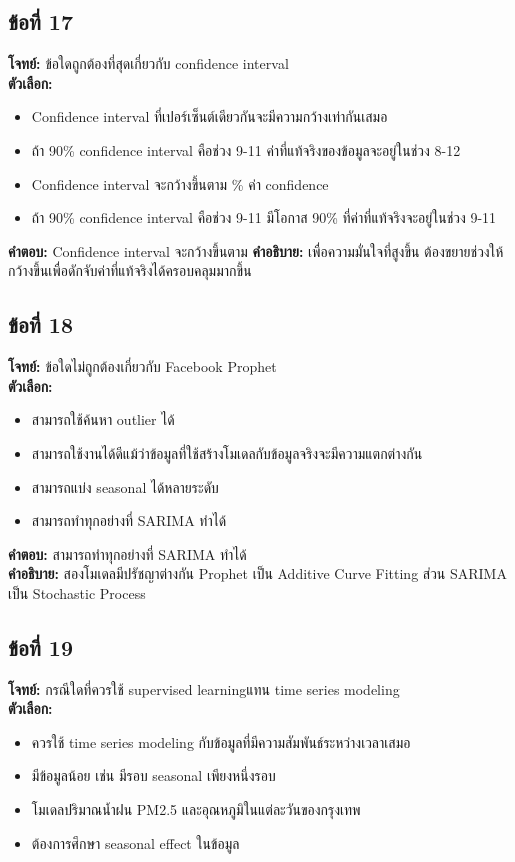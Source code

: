 \documentclass[12pt]{article}
\begin{document}
\subsection*{ข้อที่ 17}
\textbf{โจทย์:} ข้อใดถูกต้องที่สุดเกี่ยวกับ confidence interval\\
\textbf{ตัวเลือก:}
\begin{itemize}
    \item Confidence interval ที่เปอร์เซ็นต์เดียวกันจะมีความกว้างเท่ากันเสมอ
    \item ถ้า 90\% confidence interval คือช่วง 9-11 ค่าที่แท้จริงของข้อมูลจะอยู่ในช่วง 8-12
    \item Confidence interval จะกว้างขึ้นตาม \% ค่า confidence
    \item ถ้า  90\% confidence interval คือช่วง 9-11 มีโอกาส 90\% ที่ค่าที่แท้จริงจะอยู่ในช่วง 9-11
\end{itemize}

\textbf{คำตอบ:} Confidence interval จะกว้างขึ้นตาม %
\textbf{คำอธิบาย:} เพื่อความมั่นใจที่สูงขึ้น ต้องขยายช่วงให้กว้างขึ้นเพื่อดักจับค่าที่แท้จริงได้ครอบคลุมมากขึ้น

\subsection*{ข้อที่ 18}
\textbf{โจทย์:} ข้อใดไม่ถูกต้องเกี่ยวกับ Facebook Prophet\\
\textbf{ตัวเลือก:}
\begin{itemize}
    \item สามารถใช้ค้นหา outlier ได้
    \item สามารถใช้งานได้ดีแม้ว่าข้อมูลที่ใช้สร้างโมเดลกับข้อมูลจริงจะมีความแตกต่างกัน
    \item สามารถแบ่ง seasonal ได้หลายระดับ
    \item สามารถทำทุกอย่างที่ SARIMA ทำได้
\end{itemize}

\textbf{คำตอบ:} สามารถทำทุกอย่างที่ SARIMA ทำได้\\
\textbf{คำอธิบาย:} สองโมเดลมีปรัชญาต่างกัน Prophet เป็น Additive Curve Fitting ส่วน SARIMA เป็น Stochastic Process

\subsection*{ข้อที่ 19}
\textbf{โจทย์:} กรณีใดที่ควรใช้ supervised learningแทน time series modeling\\
\textbf{ตัวเลือก:}
\begin{itemize}
    \item ควรใช้ time series modeling กับข้อมูลที่มีความสัมพันธ์ระหว่างเวลาเสมอ
    \item มีข้อมูลน้อย เช่น มีรอบ seasonal เพียงหนึ่งรอบ
    \item โมเดลปริมาณน้ำฝน PM2.5 และอุณหภูมิในแต่ละวันของกรุงเทพ
    \item ต้องการศึกษา seasonal effect ในข้อมูล
\end{itemize}
\end{document}
